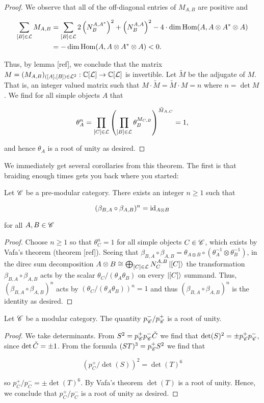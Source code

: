 \begin{proof}
We observe that all of the off-diagonal entries of $M_{A,B}$ are positive and

\begin{align*}
\sum_{[B]\in \mathcal{L}}M_{A,B} &=\sum_{[B]\in \mathcal{L}}2\left(N^{A,A^*}_{B}\right)^2+\left(N^{A,A}_{B}\right)^2 - 4\cdot \dim \operatorname{Hom}(A,A\otimes A^*\otimes A)\\
&=  -\dim \operatorname{Hom}(A,A\otimes A^*\otimes A)<0.
\end{align*}

Thus, by lemma [ref], we conclude that the matrix $M=(M_{A,B})_{([A],[B])\in \mathcal{L}^2}: \mathbb{C}[\mathcal{L}]\to\mathbb{C}[\mathcal{L}]$ is invertible. Let $\tilde{M}$ be the adjugate of $M$. That is, an integer valued matrix such that $M\cdot \tilde{M}=\tilde{M}\cdot M = n$ where $n=\det M$. We find for all simple objects $A$ that

$$\theta_{A}^n=\prod_{[C]\in \mathcal{L}}\left(\prod_{[B]\in \mathcal{L}}\theta_{B}^{M_{C,B}}\right)^{\tilde{M}_{A,C}}=1,$$

and hence $\theta_{A}$ is a root of unity as desired.

\end{proof}


We immediately get several corollaries from this theorem. The first is that braiding enough times gets you back where you started:

\begin{corollary} Let $\mathscr{C}$ be a pre-modular category. There exists an integer $n\geq 1$ such that

$$(\beta_{B,A}\circ \beta_{A,B})^{n}=\operatorname{id}_{A\otimes B}$$

for all $A,B\in \mathscr{C}$

\end{corollary}
\begin{proof} Choose $n\geq 1$ so that $\theta_{C}^n=1$ for all simple objects $C\in \mathscr{C}$, which exists by Vafa's theorem (theorem [ref]). Seeing that $\beta_{B,A}\circ \beta_{A,B}=\theta_{A\otimes B}\circ (\theta_{A}^{-1}\otimes \theta_{B}^{-1})$, in the direc sum decomposition $A\otimes B \cong \bigoplus_{[C]\in \mathcal{L}}N^{A,B}_{C}\ket{[C]}$ the transformation $\beta_{B,A}\circ \beta_{A,B}$ acts by the scalar $\theta_{C}/(\theta_{A}\theta_{B})$ on every $\ket{[C]}$ summand. Thus, $(\beta_{B,A}\circ \beta_{A,B})^n$ acts by $(\theta_{C}/(\theta_{A}\theta_{B}))^n=1$ and thus $(\beta_{B,A}\circ \beta_{A,B})^n$ is the identity as desired.
\end{proof}

\begin{corollary} Let $\mathscr{C}$ be a modular category. The quantity $p_{\mathscr{C}}^-/p_{\mathscr{C}}^+$ is a root of unity.
\end{corollary}
\begin{proof} We take determinants. From $S^2= p^{+}_{\mathscr{C}}p^{-}_{\mathscr{C}}\check{C}$ we find that $\det(S)^2=\pm p_{\mathscr{C}}^+p_{\mathscr{C}}^-$, since $\det \check{C} = \pm 1$. From the formula $(ST)^3=p^{+}_{\mathscr{C}}S^2$ we find that

$$\left(p^{+}_C/\det(S)\right)^2=\det(T)^6$$

so $p^{+}_C/p^{-}_{C}=\pm \det(T)^6$. By Vafa's theorem $\det(T)$ is a root of unity. Hence, we conclude that $p^{+}_C/p^{-}_{C}$ is a root of unity as desired.
\end{proof}

